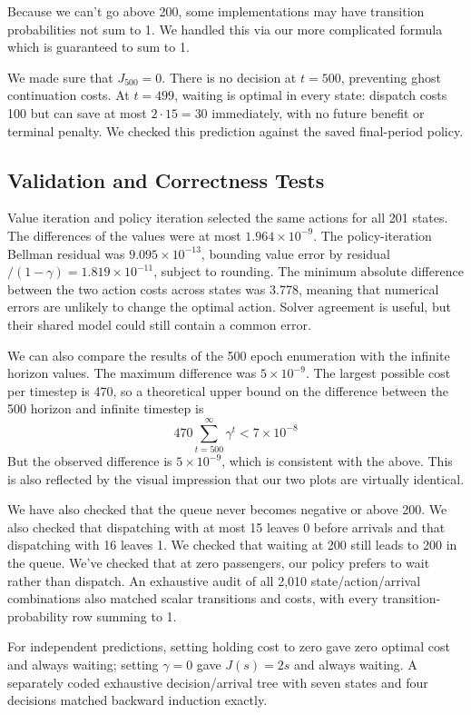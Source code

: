 \documentclass{article}
\begin{document}
Because we can't go above 200, some implementations may have transition probabilities not sum to 1. We handled this via our more complicated formula which is guaranteed to sum to 1. 

We made sure that $J_{500}=0$. There is no decision at $t=500$, preventing ghost continuation costs. At $t=499$, waiting is optimal in every state: dispatch costs 100 but can save at most $2\cdot15=30$ immediately, with no future benefit or terminal penalty. We checked this prediction against the saved final-period policy. 

\subsection{Validation and Correctness Tests}
Value iteration and policy iteration selected the same actions for all 201 states. The differences of the values were at most $1.964\times10^{-9}$. The policy-iteration Bellman residual was $9.095\times10^{-13}$, bounding value error by residual$/ (1-\gamma)=1.819\times10^{-11}$, subject to rounding. The minimum absolute difference between the two action costs across states was 3.778, meaning that numerical errors are unlikely to change the optimal action. Solver agreement is useful, but their shared model could still contain a common error.

We can also compare the results of the 500 epoch enumeration with the infinite horizon values. The maximum difference was $5 \times 10^{-9}$. The largest possible cost per timestep is 470, so a theoretical upper bound on the difference between the 500 horizon and infinite timestep is
\[ 470 \sum_{t=500}^\infty \gamma^{t} < 7 \times 10^{-8}\]
But the observed difference is $5\times 10^{-9}$, which is consistent with the above. This is also reflected by the visual impression that our two plots are virtually identical.

We have also checked that the queue never becomes negative or above 200. We also checked that dispatching with at most 15 leaves 0 before arrivals and that dispatching with 16 leaves 1. We checked that waiting at 200 still leads to 200 in the queue. We've checked that at zero passengers, our policy prefers to wait rather than dispatch. An exhaustive audit of all 2,010 state/action/arrival combinations also matched scalar transitions and costs, with every transition-probability row summing to 1.

For independent predictions, setting holding cost to zero gave zero optimal cost and always waiting; setting $\gamma=0$ gave $J(s)=2s$ and always waiting. A separately coded exhaustive decision/arrival tree with seven states and four decisions matched backward induction exactly.
\end{document}
